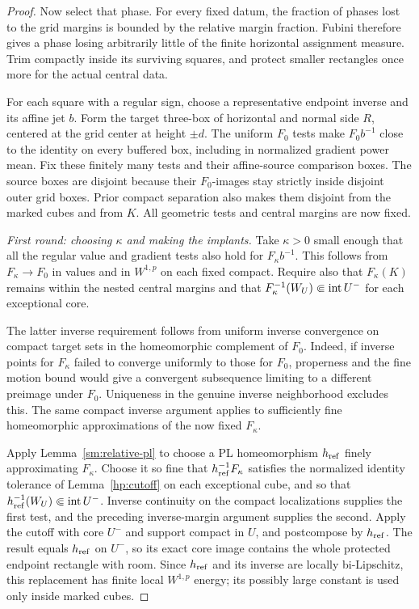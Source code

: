 \begin{proof}
Now select that phase.  For every fixed datum, the fraction of phases
lost to the grid margins is bounded by the relative margin fraction.
Fubini therefore gives a phase losing arbitrarily little of the finite
horizontal assignment measure.  Trim compactly inside its surviving
squares, and protect smaller rectangles once more for the actual
central data.

For each square with a regular sign, choose a representative endpoint
inverse and its affine jet $b$.  Form the target three-box of horizontal
and normal side $R$, centered at the grid center at height $\pm d$.
The uniform $F_0$ tests make $F_0b^{-1}$ close to the identity on
every buffered box, including in normalized gradient power mean.
Fix these finitely many tests and their affine-source comparison
boxes.  The source boxes are disjoint because their $F_0$-images stay
strictly inside disjoint outer grid boxes.  Prior compact separation
also makes them disjoint from the marked cubes and from $K$.
All geometric tests and central margins are now fixed.

\emph{First round: choosing $\kappa$ and making the implants.}
Take $\kappa>0$ small enough that all the regular value and gradient
tests also hold for $F_\kappa b^{-1}$.  This follows from
$F_\kappa\to F_0$ in values and in $W^{1,p}$ on each fixed compact.
Require also that $F_\kappa(K)$ remains within the nested central
margins and that $F_\kappa^{-1}(W_U)\Subset\operatorname{int} U^-$ for each
exceptional core.

The latter inverse requirement follows from uniform inverse convergence
on compact target sets in the homeomorphic complement of $F_0$.
Indeed, if inverse points for $F_\kappa$ failed to converge uniformly
to those for $F_0$, properness and the fine motion bound would give a
convergent subsequence limiting to a different preimage under $F_0$.
Uniqueness in the genuine inverse neighborhood excludes this.
The same compact inverse argument applies to sufficiently fine
homeomorphic approximations of the now fixed $F_\kappa$.

Apply Lemma~\ref{sm:relative-pl} to choose a PL homeomorphism
$h_{\rm ref}$ finely approximating $F_\kappa$.  Choose it so fine
that $h_{\rm ref}^{-1}F_\kappa$ satisfies the normalized identity
tolerance of Lemma~\ref{hp:cutoff} on each exceptional cube, and so
that $h_{\rm ref}^{-1}(W_U)\Subset\operatorname{int} U^-$.
Inverse continuity on the compact localizations supplies the first
test, and the preceding inverse-margin argument supplies the second.
Apply the cutoff with core $U^-$ and support compact in $U$, and
postcompose by $h_{\rm ref}$.  The result equals $h_{\rm ref}$ on
$U^-$, so its exact core image contains the whole protected endpoint
rectangle with room.  Since $h_{\rm ref}$ and its inverse are locally
bi-Lipschitz, this replacement has finite local $W^{1,p}$ energy;
its possibly large constant is used only inside marked cubes.


\end{proof}
